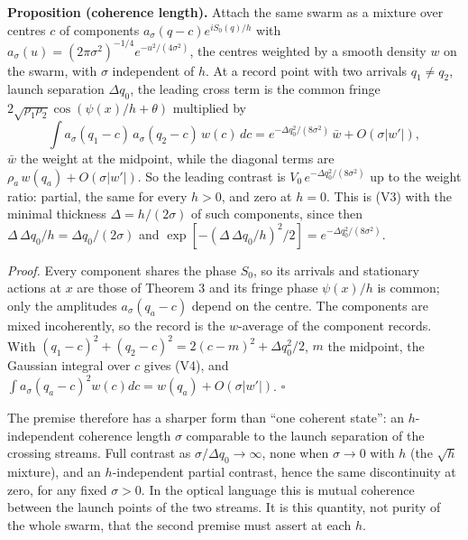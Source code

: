 \documentclass[11pt,a4paper]{article}
\begin{document}
\textbf{Proposition (coherence length).} Attach the same swarm as a
mixture over centres \(c\) of components \(a_\sigma(q-c)e^{iS_0(q)/h}\)
with \(a_\sigma(u)=(2\pi\sigma^2)^{-1/4}e^{-u^2/(4\sigma^2)}\), the
centres weighted by a smooth density \(w\) on the swarm, with \(\sigma\)
independent of \(h\). At a record point with two arrivals
\(q_1\neq q_2\), launch separation \(\Delta q_0\), the leading cross
term is the common fringe \(2\sqrt{\rho_1\rho_2}\cos(\psi(x)/h+\theta)\)
multiplied by \[\int a_\sigma(q_1-c)\,a_\sigma(q_2-c)\,w(c)\,dc
=e^{-\Delta q_0^2/(8\sigma^2)}\,\bar w+O(\sigma|w'|),\tag{V4}\]
\(\bar w\) the weight at the midpoint, while the diagonal terms are
\(\rho_a\,w(q_a)+O(\sigma|w'|)\). So the leading contrast is
\(V_0\,e^{-\Delta q_0^2/(8\sigma^2)}\) up to the weight ratio: partial,
the same for every \(h>0\), and zero at \(h=0\). This is (V3) with the
minimal thickness \(\Delta=h/(2\sigma)\) of such components, since then
\(\Delta\,\Delta q_0/h=\Delta q_0/(2\sigma)\) and
\(\exp[-(\Delta\,\Delta q_0/h)^2/2]=e^{-\Delta q_0^2/(8\sigma^2)}\).

\emph{Proof.} Every component shares the phase \(S_0\), so its arrivals
and stationary actions at \(x\) are those of Theorem 3 and its fringe
phase \(\psi(x)/h\) is common; only the amplitudes \(a_\sigma(q_a-c)\)
depend on the centre. The components are mixed incoherently, so the
record is the \(w\)-average of the component records. With
\((q_1-c)^2+(q_2-c)^2=2(c-m)^2+\Delta q_0^2/2\), \(m\) the midpoint, the
Gaussian integral over \(c\) gives (V4), and
\(\int a_\sigma(q_a-c)^2w(c)dc =w(q_a)+O(\sigma|w'|)\). \(\square\)

The premise therefore has a sharper form than ``one coherent state'': an
\(h\)-independent coherence length \(\sigma\) comparable to the launch
separation of the crossing streams. Full contrast as
\(\sigma/\Delta q_0\to\infty\), none when \(\sigma\to0\) with \(h\) (the
\(\sqrt h\) mixture), and an \(h\)-independent partial contrast, hence
the same discontinuity at zero, for any fixed \(\sigma>0\). In the
optical language this is mutual coherence between the launch points of
the two streams. It is this quantity, not purity of the whole swarm,
that the second premise must assert at each \(h\).
\end{document}
